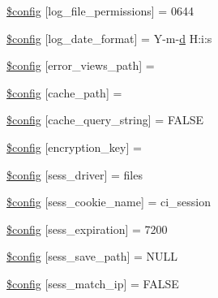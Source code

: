 \begin{DoxyCompactItemize}
\item 
\hyperlink{application_2config_2config_8php_adda49cab39a767472dca528204e5753b}{\$config} \mbox{[}\textquotesingle{}log\+\_\+file\+\_\+permissions\textquotesingle{}\mbox{]} = 0644
\item 
\hyperlink{application_2config_2config_8php_a9cc05811c32c13c55ed407435a3a31b6}{\$config} \mbox{[}\textquotesingle{}log\+\_\+date\+\_\+format\textquotesingle{}\mbox{]} = \textquotesingle{}Y-\/m-\/\hyperlink{assets_2js_2bootstrap_8min_8js_aeb337d295abaddb5ec3cb34cc2e2bbc9}{d} H\+:i\+:s\textquotesingle{}
\item 
\hyperlink{application_2config_2config_8php_a3e989981477279a1389c9295c4a5f324}{\$config} \mbox{[}\textquotesingle{}error\+\_\+views\+\_\+path\textquotesingle{}\mbox{]} = \textquotesingle{}\textquotesingle{}
\item 
\hyperlink{application_2config_2config_8php_ae3a5dd52b4d040adb6461b9a17d1e0f0}{\$config} \mbox{[}\textquotesingle{}cache\+\_\+path\textquotesingle{}\mbox{]} = \textquotesingle{}\textquotesingle{}
\item 
\hyperlink{application_2config_2config_8php_ae6508d6fa180ae0a584d6ccb03189372}{\$config} \mbox{[}\textquotesingle{}cache\+\_\+query\+\_\+string\textquotesingle{}\mbox{]} = F\+A\+L\+S\+E
\item 
\hyperlink{application_2config_2config_8php_aefa5c9d6e7a454a6218df87e65796357}{\$config} \mbox{[}\textquotesingle{}encryption\+\_\+key\textquotesingle{}\mbox{]} = \textquotesingle{}\textquotesingle{}
\item 
\hyperlink{application_2config_2config_8php_afcd06246e5564eb457c8959af88c34f1}{\$config} \mbox{[}\textquotesingle{}sess\+\_\+driver\textquotesingle{}\mbox{]} = \textquotesingle{}files\textquotesingle{}
\item 
\hyperlink{application_2config_2config_8php_acaf9fb6347a03527f4b04198d6d8155b}{\$config} \mbox{[}\textquotesingle{}sess\+\_\+cookie\+\_\+name\textquotesingle{}\mbox{]} = \textquotesingle{}ci\+\_\+session\textquotesingle{}
\item 
\hyperlink{application_2config_2config_8php_ad6a3784cad81991936465dcdac74b66a}{\$config} \mbox{[}\textquotesingle{}sess\+\_\+expiration\textquotesingle{}\mbox{]} = 7200
\item 
\hyperlink{application_2config_2config_8php_ac1db0aa8bd0457f694fdaa99cc7878a1}{\$config} \mbox{[}\textquotesingle{}sess\+\_\+save\+\_\+path\textquotesingle{}\mbox{]} = N\+U\+L\+L
\item 
\hyperlink{application_2config_2config_8php_aed449d12f2854249e5f7229fafb269b2}{\$config} \mbox{[}\textquotesingle{}sess\+\_\+match\+\_\+ip\textquotesingle{}\mbox{]} = F\+A\+L\+S\+E

\end{DoxyCompactItemize}
